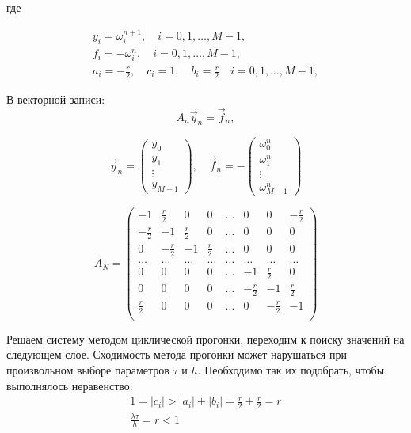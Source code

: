 \documentclass[titlepage]{article}
\def\l{\left}
\def\r{\right}
\begin{document}
где

\begin{gather*}
	y_i = \omega_{i}^{n+1}, \quad i = 0, 1, \dots, M-1, \\
	f_i = -\omega_{i}^{n}, \quad i = 0, 1, \dots, M-1, \\ 
	a_i = -\frac{r}{2}, \quad c_i = 1, \quad b_i = \frac{r}{2} \quad i = 0, 1, \dots, M-1,
\end{gather*}

В векторной записи: 
\begin{equation*}
	A_n \vec y_n = \vec f_n,
\end{equation*}

\begin{equation*}
	\vec y_n = \l(\begin{matrix} y_0 \\ y_1 \\ \vdots \\ y_{M-1} \end{matrix}\r), \quad \vec f_n = -\l(\begin{matrix} \omega_0^n \\ \omega_1^n \\ \vdots \\ \omega_{M-1}^n \end{matrix}\r) 
\end{equation*}

\begin{equation*}
	A_N = \begin{pmatrix}
		-1 & \frac{r}{2} & 0 & 0 & \dots & 0 & 0 & -\frac{r}{2} \\
		-\frac{r}{2} & -1 & \frac{r}{2} & 0 & \dots & 0 & 0 & 0 \\
		0 & -\frac{r}{2} & -1 & \frac{r}{2} & \dots & 0 & 0 & 0 \\
		\dots & \dots & \dots & \dots & \dots & \dots & \dots & \dots \\
		0 & 0 & 0 & 0 & \dots & -1 & \frac{r}{2} & 0 \\
		0 & 0 & 0 & 0 & \dots & -\frac{r}{2} & -1 & \frac{r}{2} \\
		\frac{r}{2} & 0 & 0 & 0 & \dots & 0 & -\frac{r}{2} & -1 \\
	\end{pmatrix}
\end{equation*}

Решаем систему методом циклической прогонки, переходим к поиску значений на следующем слое. Сходимость метода прогонки может нарушаться при произвольном выборе параметров $\tau$ и $h$. Необходимо так их подобрать, чтобы выполнялось неравенство:
\begin{gather*}
	1 = |c_i| > |a_i| + |b_i| = \frac{r}{2} + \frac{r}{2} = r \\
	\frac{\lambda\tau}{h} = r < 1
\end{gather*}
\end{document}
